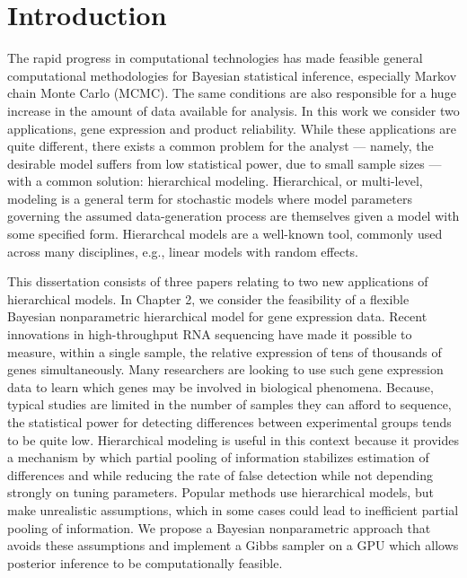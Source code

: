 \chapter{Introduction}
The rapid progress in computational technologies has made feasible general computational methodologies for Bayesian statistical inference, especially Markov chain Monte Carlo (MCMC). The same conditions are also responsible for a huge increase in the amount of data available for analysis. In this work we consider two applications, gene expression and product reliability. While these applications are quite different, there exists a common problem for the analyst --- namely, the desirable model suffers from low statistical power, due to small sample sizes --- with a common solution: hierarchical modeling. Hierarchical, or multi-level, modeling is a general term for stochastic models where model parameters governing the assumed data-generation process are themselves given a model with some specified form. Hierarchcal models are a well-known tool, commonly used across many disciplines, e.g., linear models with random effects.

This dissertation consists of three papers relating to two new applications of hierarchical models. In Chapter 2, we consider the feasibility of a flexible Bayesian nonparametric hierarchical model for gene expression data. Recent innovations in high-throughput RNA sequencing have made it possible to measure, within a single sample, the relative expression of tens of thousands of genes simultaneously. Many researchers are looking to use such gene expression data to learn which genes may be involved in biological phenomena. Because, typical studies are limited in the number of samples they can afford to sequence, the statistical power for detecting differences between experimental groups tends to be quite low. Hierarchical modeling is useful in this context because it provides a mechanism by which partial pooling of information stabilizes estimation of differences and while reducing the rate of false detection while not depending strongly on tuning parameters. Popular methods use hierarchical models, but make unrealistic assumptions, which in some cases could lead to inefficient partial pooling of information. We propose a Bayesian nonparametric approach that avoids these assumptions and implement a Gibbs sampler on a GPU which allows posterior inference to be computationally feasible.

